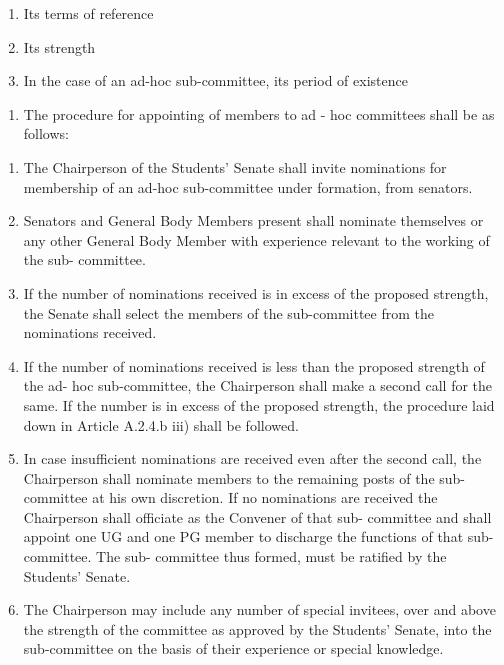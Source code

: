 \begin{enumerate}
  \begin{enumerate}
  \def\labelenumii{\arabic{enumii}.}
  \item
    Its terms of reference
  \item
    Its strength
  \item
    In the case of an ad-hoc sub-committee, its period of existence
  \end{enumerate}

  \begin{enumerate}
  \def\labelenumii{\alph{enumii}.}
  \setcounter{enumii}{1}
  \itemsep1pt\parskip0pt
  \item
    The procedure for appointing of members to ad - hoc committees shall
    be as follows:
  \end{enumerate}

  \begin{enumerate}
  \def\labelenumii{\arabic{enumii}.}
  \item
    The Chairperson of the Students' Senate shall invite nominations for
    membership of an ad-hoc sub-committee under formation, from
    senators.
  \item
    Senators and General Body Members present shall nominate themselves
    or any other General Body Member with experience relevant to the
    working of the sub- committee.
  \item
    If the number of nominations received is in excess of the proposed
    strength, the Senate shall select the members of the sub-committee
    from the nominations received.
  \item
    If the number of nominations received is less than the proposed
    strength of the ad- hoc sub-committee, the Chairperson shall make a
    second call for the same. If the number is in excess of the proposed
    strength, the procedure laid down in Article A.2.4.b iii) shall be
    followed.
  \item
    In case insufficient nominations are received even after the second
    call, the Chairperson shall nominate members to the remaining posts
    of the sub-committee at his own discretion. If no nominations are
    received the Chairperson shall officiate as the Convener of that
    sub- committee and shall appoint one UG and one PG member to
    discharge the functions of that sub-committee. The sub- committee
    thus formed, must be ratified by the Students' Senate.
  \item
    The Chairperson may include any number of special invitees, over and
    above the strength of the committee as approved by the Students'
    Senate, into the sub-committee on the basis of their experience or
    special knowledge.
  \end{enumerate}


\end{enumerate}
